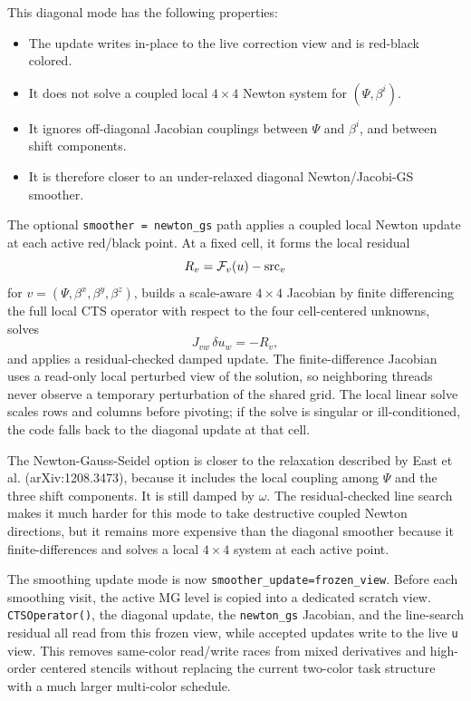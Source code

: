 \documentclass[11pt]{article}
\newcommand{\code}[1]{\texttt{#1}}
\begin{document}
This diagonal mode has the following properties:
\begin{itemize}
  \item The update writes in-place to the live correction view and is red-black
        colored.
  \item It does not solve a coupled local \(4\times4\) Newton system for
        \((\Psi,\beta^i)\).
  \item It ignores off-diagonal Jacobian couplings between \(\Psi\) and
        \(\beta^i\), and between shift components.
  \item It is therefore closer to an under-relaxed diagonal Newton/Jacobi-GS
        smoother.
\end{itemize}

The optional \code{smoother = newton\_gs} path applies a coupled local Newton
update at each active red/black point.  At a fixed cell, it forms the local
residual
\[
  R_v = \mathcal{F}_v(u)-{\rm src}_v
\]
for \(v=(\Psi,\beta^x,\beta^y,\beta^z)\), builds a scale-aware \(4\times4\)
Jacobian by finite differencing the full local CTS operator with respect to the
four cell-centered unknowns, solves
\[
  J_{vw}\,\delta u_w = -R_v,
\]
and applies a residual-checked damped update.  The finite-difference Jacobian
uses a read-only local perturbed view of the solution, so neighboring threads
never observe a temporary perturbation of the shared grid.  The local linear
solve scales rows and columns before pivoting; if the solve is singular or
ill-conditioned, the code falls back to the diagonal update at that cell.

The Newton-Gauss-Seidel option is closer to the relaxation described by East
et al. (arXiv:1208.3473), because it includes the local coupling among \(\Psi\)
and the three shift components.  It is still damped by \(\omega\).  The
residual-checked line search makes it much harder for this mode to take
destructive coupled Newton directions, but it remains more expensive than the
diagonal smoother because it finite-differences and solves a local \(4\times4\)
system at each active point.

The smoothing update mode is now \code{smoother\_update=frozen\_view}.  Before
each smoothing visit, the active MG level is copied into a dedicated scratch
view.  \code{CTSOperator()}, the diagonal update, the \code{newton\_gs} Jacobian,
and the line-search residual all read from this frozen view, while accepted
updates write to the live \code{u} view.  This removes same-color read/write
races from mixed derivatives and high-order centered stencils without replacing
the current two-color task structure with a much larger multi-color schedule.
\end{document}
